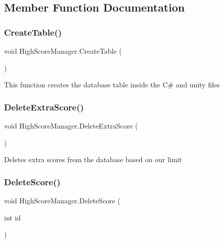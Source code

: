 \subsection{Member Function Documentation}
\mbox{\label{class_high_score_manager_a4a5a8e7cf5168aba0841c78432294a4a}} 
\subsubsection{\texorpdfstring{Create\+Table()}{CreateTable()}}
{\footnotesize\ttfamily void High\+Score\+Manager.\+Create\+Table (\begin{DoxyParamCaption}{ }\end{DoxyParamCaption})\hspace{0.3cm}{\ttfamily [private]}}



This function creates the database table inside the C\# and unity files 

\mbox{\label{class_high_score_manager_a6b8807e7293dddf882b3faf180e68ecd}} 
\subsubsection{\texorpdfstring{Delete\+Extra\+Score()}{DeleteExtraScore()}}
{\footnotesize\ttfamily void High\+Score\+Manager.\+Delete\+Extra\+Score (\begin{DoxyParamCaption}{ }\end{DoxyParamCaption})\hspace{0.3cm}{\ttfamily [private]}}



Deletes extra scores from the database based on our limit 

\mbox{\label{class_high_score_manager_a2051e83d70923629fdc6bd68c7e4eac9}} 
\subsubsection{\texorpdfstring{Delete\+Score()}{DeleteScore()}}
{\footnotesize\ttfamily void High\+Score\+Manager.\+Delete\+Score (\begin{DoxyParamCaption}\item[{int}]{id }\end{DoxyParamCaption})\hspace{0.3cm}{\ttfamily [private]}}



